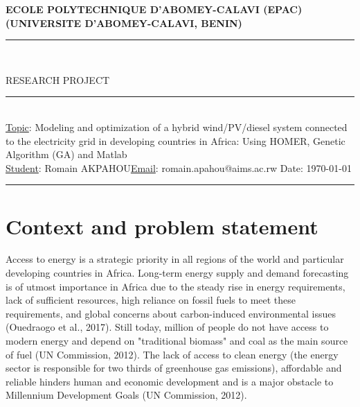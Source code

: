 \documentclass[11.8pt,a4paper]{article}
\begin{document}
	
	\thispagestyle{empty}
	\begin{center}
		\textbf{ECOLE POLYTECHNIQUE D'ABOMEY-CALAVI (EPAC) \\[0.5cm]
			(UNIVERSITE D'ABOMEY-CALAVI, BENIN)}
		\vspace{1.0cm}
	\end{center}
	
	\noindent
	\rule{17cm}{0.2cm}\\[0.05cm]
	\begin{center}
		RESEARCH PROJECT
	\end{center}
	\rule{17cm}{0.05cm}
	\vspace{0.5cm}
\noindent\\
\underline{Topic}: Modeling and optimization of a hybrid wind/PV/diesel system
connected to the electricity grid in developing countries in Africa: Using HOMER, Genetic Algorithm (GA) and Matlab\hfill\\

\noindent\underline{Student}: Romain AKPAHOU\hfill \underline{Email}: romain.apahou@aims.ac.rw \hfill Date: \today\\
\rule{17cm}{0.05cm}
\section{Context and problem statement}
Access to energy is a strategic priority in all regions of the world and particular developing countries in Africa. Long-term energy supply and demand forecasting is of utmost importance in Africa due to the steady rise in energy requirements, lack of sufficient resources, high reliance on fossil fuels to meet these requirements, and global concerns about carbon-induced environmental issues (Ouedraogo et al., 2017). Still today, million of people do not have access to modern energy and depend on "traditional biomass" and coal as the main source of fuel (UN Commission, 2012). The lack of access to clean energy (the energy sector is responsible for two thirds of greenhouse gas emissions), affordable and reliable hinders human and economic development and is a major obstacle to Millennium Development Goals (UN Commission, 2012).
\end{document}
